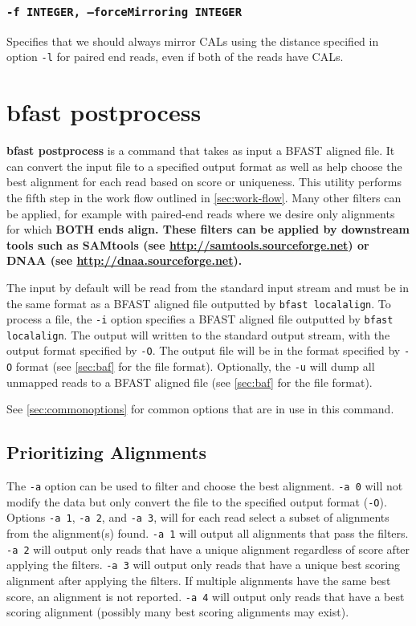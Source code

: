 \documentclass[a4paper,12pt]{book}
\newcommand{\TT}[1]{{\tt #1}} %
\newcommand{\BF}[1]{{\bf #1}} %
\newcommand{\BAF}{BFAST aligned file} %
\begin{document}
\subsubsection{\TT{-f INTEGER, --forceMirroring INTEGER}}
Specifies that we should always mirror CALs using the distance specified in option \TT{-l} for paired end reads, even if both of the reads have CALs.

\section{bfast postprocess}
\label{sec:postprocess}
\BF{bfast postprocess} is a command that takes as input a \BAF{}.
It can convert the input file to a specified output format as well as help choose the best alignment for each read based on score or uniqueness.
This utility performs the fifth step in the work flow outlined in \autoref{sec:work-flow}.
Many other filters can be applied, for example with paired-end reads where we desire only alignments for which \bf{BOTH} ends align. 
These filters can be applied by downstream tools such as SAMtools (see \url{http://samtools.sourceforge.net}) or DNAA (see \url{http://dnaa.sourceforge.net}).

The input by default will be read from the standard input stream and must be in the same format as a \BAF{} outputted by \TT{bfast localalign}.
To process a file, the \TT{-i} option specifies a \BAF{} outputted by \TT{bfast localalign}.
The output will written to the standard output stream, with the output format specified by \TT{-O}.
The output file will be in the format specified by \TT{-O} format (see \autoref{sec:baf} for the file format).
Optionally, the \TT{-u} will dump all unmapped reads to a \BAF{} (see \autoref{sec:baf} for the file format).

See \autoref{sec:commonoptions} for common options that are in use in this command.

\subsection{Prioritizing Alignments}
\label{sec:prioritizing-alignments}

The \TT{-a} option can be used to filter and choose the best alignment.
\TT{-a 0} will not modify the data but only convert the file to the specified output format (\TT{-O}).
Options \TT{-a 1}, \TT{-a 2}, and \TT{-a 3}, will for each read select a subset of alignments from the alignment(s) found.
\TT{-a 1} will output all alignments that pass the filters.
\TT{-a 2} will output only reads that have a unique alignment regardless of score after applying the filters.
\TT{-a 3} will output only reads that have a unique best scoring alignment after applying the filters.
If multiple alignments have the same best score, an alignment is not reported.
\TT{-a 4} will output only reads that have a best scoring alignment (possibly many best scoring alignments may exist).
\end{document}
